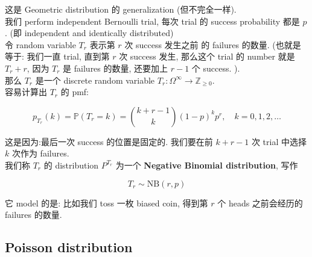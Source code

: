 \begin{example}

这是 Geometric distribution 的 generalization (但不完全一样).\\
我们 perform independent Bernoulli trial, 每次 trial 的 success probability 都是 \(\mathit{p}\). (即 independent and identically distributed)\\
令 random variable \(\mathit{T}_{\mathit{r}}\) 表示第 \(\mathit{r}\) 次 success 发生之前 的 failures 的数量. (也就是等于: 我们一直 trial, 直到第 \(\mathit{r}\) 次 success 发生, 那么这个 trial 的 number 就是 \(\mathit{T}_{\mathit{r}} + \mathit{r}\), 因为 \(\mathit{T}_{\mathit{r}}\) 是 failures 的数量, 还要加上 \(\mathit{r} - 1\) 个 success. ).\\
那么 \(\mathit{T}_{\mathit{r}}\) 是一个 discrete random variable \(\mathit{T}_{\mathit{r}}:\Omega^{\infty}\rightarrow\mathbb{Z}_{\geq 0}\).\\
容易计算出 \(\mathit{T}_{\mathit{r}}\) 的 pmf:

\[\mathit{p}_{\mathit{T}_{\mathit{r}}}(\mathit{k}) = \mathbb{P}(\mathit{T}_{\mathit{r}} = \mathit{k}) = \binom{\mathit{k} + \mathit{r} - 1}{\mathit{k}}(1 - \mathit{p})^{\mathit{k}}\mathit{p}^{\mathit{r}},\quad\mathit{k} = 0,1,2,\ldots\]

这是因为:最后一次 success 的位置是固定的. 我们要在前 \(\mathit{k} + \mathit{r} - 1\) 次 trial 中选择 \(\mathit{k}\) 次作为 failures.\\
我们称 \(\mathit{T}_{\mathit{r}}\) 的 distribution \(\mathit{P}^{\mathit{T}_{\mathit{r}}}\) 为一个 \textbf{Negative Binomial distribution}, 写作

\[\mathit{T}_{\mathit{r}} \sim \text{NB}(\mathit{r},\mathit{p})\]

它 model 的是: 比如我们 toss 一枚 biased coin, 得到第 \(\mathit{r}\) 个 heads 之前会经历的 failures 的数量.\\

\end{example}

\subsection{Poisson distribution}\label{poisson-distribution}

